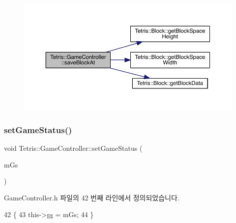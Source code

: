 \nopagebreak
\begin{figure}[H]
\begin{center}
\leavevmode
\includegraphics[width=350pt]{db/dd2/class_tetris_1_1_game_controller_adc067380df0f0da4ea4a358d00d6a123_cgraph}
\end{center}
\end{figure}
\mbox{\label{class_tetris_1_1_game_controller_a013cef75ba09bdb7d95ae1df8497b8f5}} 
\subsubsection{\texorpdfstring{set\+Game\+Status()}{setGameStatus()}\hspace{0.1cm}{\footnotesize\ttfamily [1/2]}}
{\footnotesize\ttfamily void Tetris\+::\+Game\+Controller\+::set\+Game\+Status (\begin{DoxyParamCaption}\item[{\hyperlink{class_tetris_1_1_game_controller_a96a963b56385f3b3a122ff0ca2beb770}{Game\+Controller\+::\+Game\+Status}}]{m\+Gs }\end{DoxyParamCaption})\hspace{0.3cm}{\ttfamily [inline]}}



Game\+Controller.\+h 파일의 42 번째 라인에서 정의되었습니다.


\begin{DoxyCode}
42                                                         \{
43             this->\hyperlink{class_tetris_1_1_game_controller_ae4c894005a82404c73a5a9a6efb208dc}{gs} = mGs;
44         \}
\end{DoxyCode}
\mbox{\label{class_tetris_1_1_game_controller_ae56eaf2e16714ef0e043c050b1aa0833}} 
